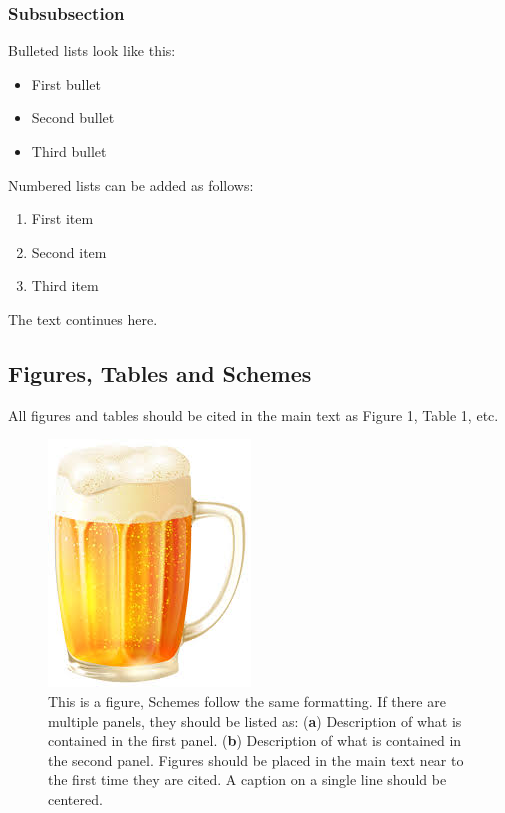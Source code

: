 \documentclass[bioengineering,article,submit,moreauthors,pdftex,10pt,a4paper]{mdpi}
\begin{document}
\subsubsection{Subsubsection}

Bulleted lists look like this:
\begin{itemize}[leftmargin=*,labelsep=5.8mm]
\item	First bullet
\item	Second bullet
\item	Third bullet
\end{itemize}

Numbered lists can be added as follows:
\begin{enumerate}[leftmargin=*,labelsep=4.9mm]
\item	First item 
\item	Second item
\item	Third item
\end{enumerate}

The text continues here.

\subsection{Figures, Tables and Schemes}

All figures and tables should be cited in the main text as Figure 1, Table 1, etc.

 \begin{figure}[H]
 	\caption{\label{beer}This is a figure, Schemes follow the same formatting. If there are multiple panels, they should be listed as: (\textbf{a}) Description of what is contained in the first panel. (\textbf{b}) Description of what is contained in the second panel. Figures should be placed in the main text near to the first time they are cited. A caption on a single line should be centered.}
 	\begin{center}
 		\includegraphics[scale=0.40]{imagens/beer.jpg} 		
 	\end{center}
 \end{figure}  
\end{document}
